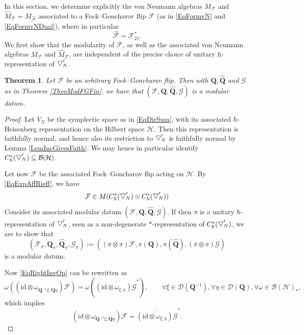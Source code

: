 \documentclass[11pt, reqno]{amsart}
\newtheorem{theorem}{Theorem}[section]
\theoremstyle{definition}
\numberwithin{equation}{section}
\def\msD{\mathscr D}
\newcommand{\Hsp}{\mathcal{H}}
\newcommand{\Bc}{\mathcal{B}}
\newcommand{\Qb}{\mathbf{Q}}
\newcommand{\Fct}{\mathcal{F}}
\newcommand{\tFct}{\mathcal{G}}
\newcommand{\id}{\mathrm{id}}
\newcommand{\wbtd}[1]{\raisebox{\depth}{$\bigtriangledown'$\!\!}_{#1}}
\begin{document}
In this section, we determine explicitly the von Neumann algebras $M_{\Fct}$ and $\hat{M}_{\Fct} = M_{\hat{\Fct}}$ associated to a Fock--Goncharov flip $\Fct$ (as in \eqref{EqFormvN} and \eqref{EqFormvNDual}), where in particular 
\[
\hat{\Fct} = \Fct_{21}^*.
\]
We first show that the modularity of $\Fct$, as well as the associated von Neumann algebras $M_{\Fct}$ and $\hat{M}_{\Fct}$, are independent of the precise choice of unitary $\hbar$-representation of $\wbtd{N}$.  


\begin{theorem}\label{EqFGGeneralMod}
Let $\Fct$ be an arbitrary Fock--Goncharov flip. Then with $\Qb,\hat{\Qb}$ and $\tFct$ as in Theorem \ref{TheoModFGFin}, we have that $(\Fct,\Qb,\hat{\Qb},\tFct)$ is a  modular datum.
\end{theorem}
\begin{proof}
Let $V_N$ be the symplectic space as in \eqref{EqDirSum}, with its associated $\hbar$-Heisenberg representation on the Hilbert space $\Hsp$. Then this representation is faithfully normal, and hence also its restriction to $\wbtd{N}$ is faithfully normal by Lemma \ref{LemIncGivesFaith}. We may hence in particular identify $C^*_{\hbar}(\wbtd{N}) \subseteq \Bc(\Hsp)$. 

Let now $\Fct$ be the associated Fock--Goncharov flip acting on $\Hsp$. By \eqref{EqExpAffRieff}, we have 
\begin{equation}\label{EqWeakAffiliation}
\Fct \in M(C^*_{\hbar}(\wbtd{N})\otimes C^*_{\hbar}(\wbtd{N}))
\end{equation}
Consider its associated modular datum $(\Fct,\Qb,\hat{\Qb},\tFct)$. If then $\pi$ is a unitary $\hbar$-representation of $\wbtd{N}$, seen as a non-degenerate $*$-representation of $C^*_{\hbar}(\wbtd{N})$, we are to show that 
\[
(\Fct_{\pi},\Qb_{\pi},\hat{\Qb}_{\pi},\tFct_{\pi}) := ((\pi\otimes \pi)\Fct,\pi(\Qb),\pi(\hat{\Qb}),(\overline{\pi}\otimes \pi)\tFct)
\]
is a modular datum. 

Now \eqref{EqRightInvOp} can be rewritten as 
\[
\omega((\id\otimes \omega_{\Qb^{-1}\xi,\Qb\eta})\Fct) = \omega(\overline{(\id\otimes \omega_{\xi,\eta})\tFct}^*),\qquad \forall \xi \in \msD(\Qb^{-1}),\forall \eta\in \msD(\Qb),\forall \omega \in \Bc(\Hsp)_*,
\]
which implies 
\[
(\id\otimes \omega_{\Qb^{-1}\xi,\Qb\eta})\Fct = \overline{(\id\otimes \omega_{\xi,\eta})\tFct}^*.
\]


\end{proof}
\end{document}
